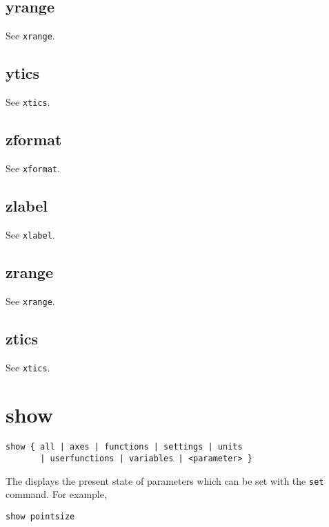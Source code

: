 \subsection{yrange}

See {\tt xrange}.


\subsection{ytics}

See {\tt xtics}.


\subsection{zformat}

See {\tt xformat}.


\subsection{zlabel}

See {\tt xlabel}.


\subsection{zrange}

See {\tt xrange}.


\subsection{ztics}

See {\tt xtics}.


\section{show}

\begin{verbatim}
show { all | axes | functions | settings | units
       | userfunctions | variables | <parameter> }
\end{verbatim}

The  displays the present state of parameters which can be set
with the {\tt set} command. For example,

\begin{verbatim}
show pointsize
\end{verbatim}

